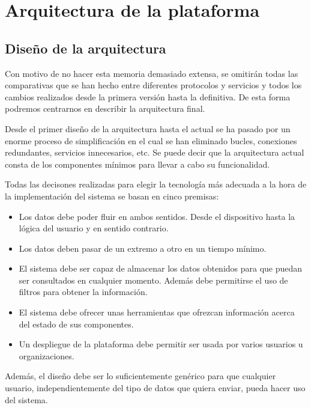 \chapter{Arquitectura de la plataforma}
\pagestyle{esitscCD}

\section{Diseño de la arquitectura}

Con motivo de no hacer esta
memoria demasiado extensa, se omitirán todas las comparativas que se han hecho
entre diferentes protocolos y servicios y todos los cambios realizados desde la
primera versión hasta la definitiva. De esta forma podremos centrarnos en
describir la arquitectura final.

Desde el primer diseño de la arquitectura hasta el actual se ha pasado por un
enorme proceso de simplificación en el cual se han eliminado bucles, conexiones
redundantes, servicios innecesarios, etc. Se puede decir que la arquitectura
actual consta de los componentes mínimos para llevar a cabo su funcionalidad.

Todas las decisones realizadas para elegir la tecnología más adecuada a la hora
de la implementación del sistema se basan en cinco premisas:

\begin{itemize}\itemsep1pt \parskip0pt 
\item {} Los datos debe poder fluir en ambos sentidos. Desde el
dispositivo hasta la lógica del usuario y en sentido contrario.
\item {} Los datos deben pasar de un extremo a otro en un tiempo mínimo.
\item {} El sistema debe ser capaz de almacenar los datos obtenidos para
que puedan ser consultados en cualquier momento. Además debe permitirse el uso
de filtros para obtener la información.
\item {} El sistema debe ofrecer unas herramientas que ofrezcan
información acerca del estado de sus componentes.
\item {} Un despliegue de la plataforma debe permitir ser usada por
varios usuarios u organizaciones.
\end{itemize}

Además, el diseño debe ser lo suficientemente genérico para que cualquier
usuario, independientemente del tipo de datos que quiera enviar, pueda hacer uso
del sistema.

